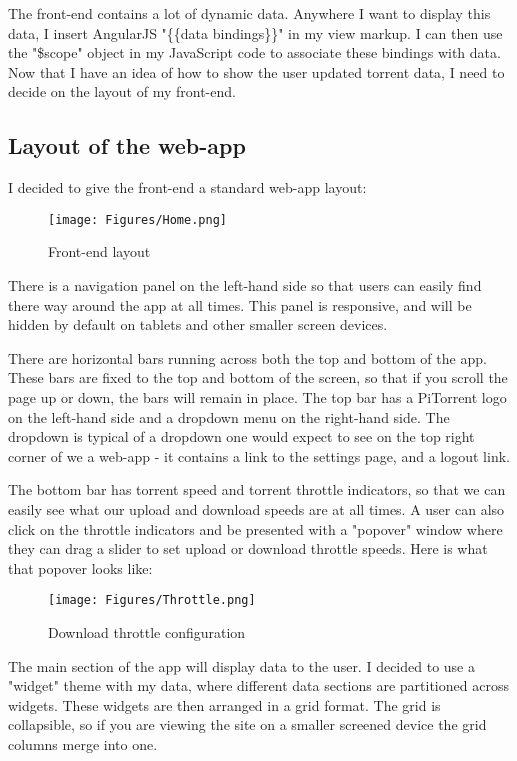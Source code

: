 The front-end contains a lot of dynamic data. Anywhere I want to display this data, I insert AngularJS "\{\{data bindings\}\}" in my view markup. I can then use the "\$scope" object in my JavaScript code to associate these bindings with data. Now that I have an idea of how to show the user updated torrent data, I need to decide on the layout of my front-end.

\subsection{Layout of the web-app}
I decided to give the front-end a standard web-app layout:

\vspace{10px}
\begin{figure}[h!]
  \centering
    \texttt{[image: Figures/Home.png]}
  \caption{Front-end layout}
\end{figure}

There is a navigation panel on the left-hand side so that users can easily find there way around the app at all times. This panel is responsive, and will be hidden by default on tablets and other smaller screen devices. 

There are horizontal bars running across both the top and bottom of the app. These bars are fixed to the top and bottom of the screen, so that if you scroll the page up or down, the bars will remain in place. The top bar has a PiTorrent logo on the left-hand side and a dropdown menu on the right-hand side. The dropdown is typical of a dropdown one would expect to see on the top right corner of we a web-app - it contains a link to the settings page, and a logout link. 

The bottom bar has torrent speed and torrent throttle indicators, so that we can easily see what our upload and download speeds are at all times. A user can also click on the throttle indicators and be presented with a "popover" window where they can drag a slider to set upload or download throttle speeds. Here is what that popover looks like:

\vspace{10px}
\begin{figure}[h!]
  \centering
    \texttt{[image: Figures/Throttle.png]}
  \caption{Download throttle configuration}
\end{figure}

The main section of the app will display data to the user. I decided to use a "widget" theme with my data, where different data sections are partitioned across widgets. These widgets are then arranged in a grid format. The grid is collapsible, so if you are viewing the site on a smaller screened device the grid columns merge into one. 

